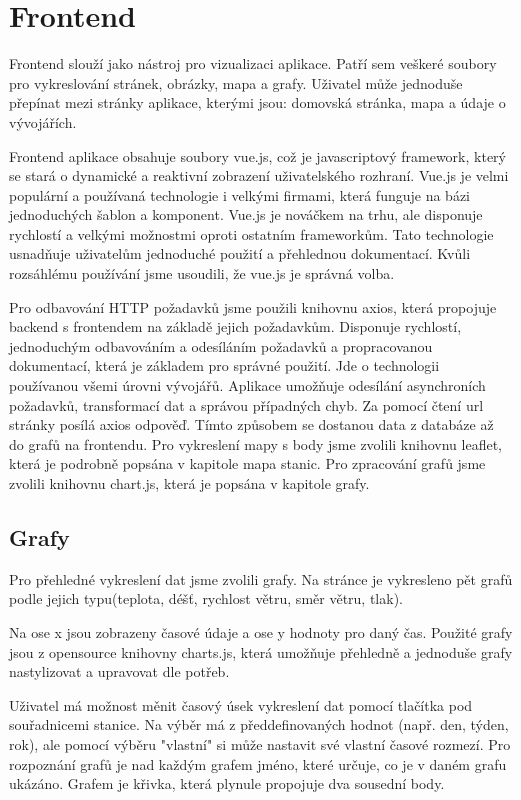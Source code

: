 \section{Frontend} \label{frontend}
Frontend slouží jako nástroj pro vizualizaci aplikace. Patří sem veškeré soubory pro vykreslování stránek, obrázky, mapa a grafy. Uživatel může jednoduše přepínat mezi stránky aplikace, kterými jsou: domovská stránka, mapa a údaje o vývojářích.

Frontend aplikace obsahuje soubory vue.js, což je javascriptový framework, který se stará o dynamické a reaktivní zobrazení uživatelského rozhraní. Vue.js je velmi populární a používaná technologie i velkými firmami, která funguje na bázi jednoduchých šablon a komponent.
Vue.js je nováčkem na trhu, ale disponuje rychlostí a velkými možnostmi oproti ostatním frameworkům.
Tato technologie usnadňuje uživatelům jednoduché použití a přehlednou dokumentací. Kvůli rozsáhlému používání jsme usoudili, že vue.js je správná volba. 

Pro odbavování HTTP požadavků jsme použili knihovnu axios, která propojuje backend s frontendem na základě jejich požadavkům. Disponuje rychlostí, jednoduchým odbavováním a odesíláním požadavků a propracovanou dokumentací, která je základem pro správné použití.
Jde o technologii používanou všemi úrovni vývojářů. Aplikace umožňuje odesílání asynchroních požadavků, transformací dat a správou případných chyb.
Za pomocí čtení url stránky posílá axios odpověď. Tímto způsobem se dostanou data z databáze až do grafů na frontendu. 
Pro vykreslení mapy s body jsme zvolili knihovnu leaflet, která je podrobně popsána v kapitole mapa stanic. Pro zpracování grafů jsme zvolili knihovnu chart.js, která je popsána v kapitole grafy.

\subsection{Grafy}
Pro přehledné vykreslení dat jsme zvolili grafy. Na stránce je vykresleno pět grafů podle jejich typu(teplota, déšť, rychlost větru, směr větru, tlak). %

Na ose x jsou zobrazeny časové údaje a ose y hodnoty pro daný čas. Použité grafy jsou z opensource knihovny charts.js, která umožňuje přehledně a jednoduše grafy nastylizovat a upravovat dle potřeb.

Uživatel má možnost měnit časový úsek vykreslení dat pomocí tlačítka pod souřadnicemi stanice. Na výběr má z předdefinovaných hodnot (např. den, týden, rok), ale pomocí výběru "vlastní" si může nastavit své vlastní časové rozmezí.
Pro rozpoznání grafů je nad každým grafem jméno, které určuje, co je v daném grafu ukázáno. Grafem je křivka, která plynule propojuje dva sousední body.  

